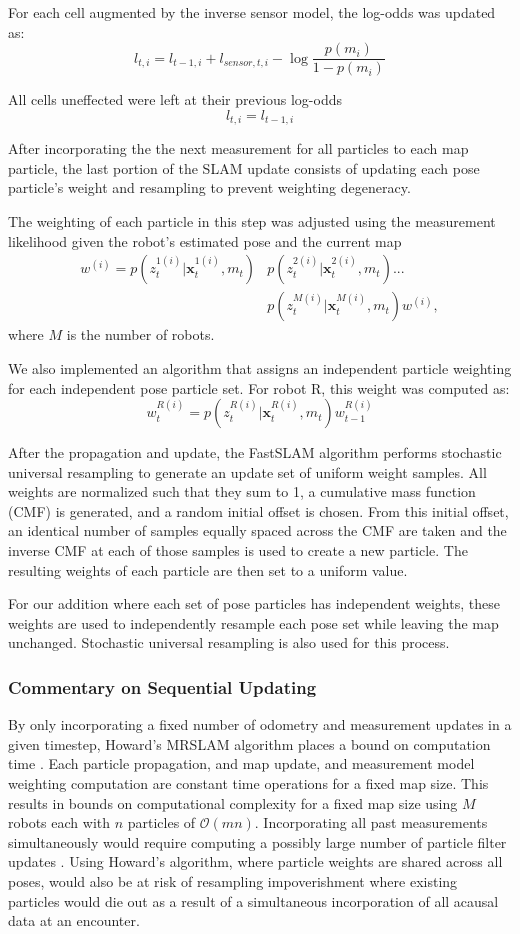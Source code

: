 For each cell augmented by the inverse sensor model, the log-odds was updated as:
$$l_{t,i}=l_{t-1,i}+l_{sensor,t,i}-\log\frac{p(m_i)}{1-p(m_i)}$$

All cells uneffected were left at their previous log-odds
$$l_{t,i}=l_{t-1,i}$$

After incorporating the the next measurement for all particles to each map particle, the last portion of the SLAM update consists of updating each pose particle’s weight and resampling to prevent weighting degeneracy.

The weighting of each particle in this step was adjusted using the measurement likelihood given the robot's estimated pose and the current map 
\begin{align}
w^{(i)}=p(z_t^{1(i)}|\textbf{x}_t^{1(i)},m_t)&p(z_t^{2(i)}|\textbf{x}_t^{2(i)},m_t)...\\
&p(z_t^{M(i)}|\textbf{x}_t^{M(i)},m_t)w^{(i)},
\end{align}
where $M$ is the number of robots.

We also implemented an algorithm that assigns an independent particle weighting for each independent pose particle set. For robot R, this weight was computed as:
$$w_t^{R(i)}=p(z_t^{R(i)}|\textbf{x}_t^{R(i)},m_t)w_{t-1}^{R(i)}$$

After the propagation and update, the FastSLAM algorithm performs stochastic universal resampling to generate an update set of uniform weight samples. All weights are normalized such that they sum to 1, a cumulative mass function (CMF) is generated, and a random initial offset is chosen. From this initial offset, an identical number of samples equally spaced across the CMF are taken and the inverse CMF at each of those samples is used to create a new particle. The resulting weights of each particle are then set to a uniform value. 

For our addition where each set of pose particles has independent weights, these weights are used to independently resample each pose set while leaving the map unchanged. Stochastic universal resampling is also used for this process.
\vspace{0.1in}
\subsubsection{Commentary on Sequential Updating}
By only incorporating a fixed number of odometry and measurement updates in a given timestep, Howard's MRSLAM algorithm places a bound on computation time \cite{howard2006multi}. Each particle propagation, and map update, and measurement model weighting computation are constant time operations for a fixed map size. This results in bounds on computational complexity for a fixed map size using $M$ robots each with $n$ particles of $\mathcal{O}(mn)$. Incorporating all past measurements simultaneously would require computing a possibly large number of particle filter updates \cite{howard2006multi}. Using Howard's algorithm, where particle weights are shared across all poses, would also be at risk of resampling impoverishment where existing particles would die out as a result of a simultaneous incorporation of all acausal data at an encounter.

